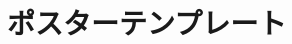 \documentclass[12pt, a4j, dvipdfmx, jis2004]{jsarticle}
\begin{document}
\sffamily\gtfamily
\newpage
\section*{ポスターテンプレート}
\end{document}
